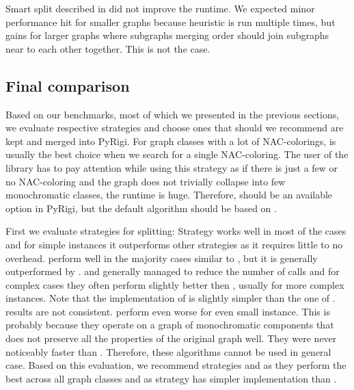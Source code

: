 Smart split described in 
did not improve the runtime.
We expected minor performance hit for smaller graphs because heuristic is run
multiple times, but gains for larger graphs where subgraphs merging order
should join subgraphs near to each other together. This is not the case.

\subsection{Final comparison}

Based on our benchmarks, most of which we presented in the previous sections,
we evaluate respective strategies and choose ones
that should we recommend are kept and merged into PyRigi.
%
For graph classes with a lot of NAC-colorings,
\NaiveCycles{} is usually the best choice
when we search for a single NAC-coloring.
%
The user of the library has to pay attention while using this strategy
as if there is just a few or no NAC-coloring and the graph does not trivially collapse
into few monochromatic classes, the runtime is huge.
Therefore, \NaiveCycles{} should be an available option in PyRigi,
but the default algorithm should be based on \Subgraphs{}.

First we evaluate strategies for splitting:
Strategy \None{} works well in most of the cases and for simple
instances it outperforms other strategies as it requires little to no overhead.
%
\CyclesMatchChunks{} perform well in the majority cases similar to \None{},
but it is generally outperformed by \Neighbors{}.
%
\Neighbors{} and \NeighborsDegree{} generally managed to reduce the number
of \IsNACColoring{} calls and for complex cases they often
perform slightly better then \None{}, usually for more complex instances.
Note that the implementation of \Neighbors{} is slightly simpler than
the one of \NeighborsDegree{}.
%
\KernighanLin{} results are not consistent.
\Cuts{} perform even worse for even small instance.
This is probably because they operate on a graph of monochromatic
components that does not preserve all the properties
of the original graph well.
They were never noticeably faster than \Neighbors{}.
Therefore, these algorithms cannot be used in general case.
%
Based on this evaluation, we recommend strategies \None{} and \Neighbors{}
as they perform the best across all graph classes and
as \Neighbors{} strategy has simpler implementation than \NeighborsDegree{}.


